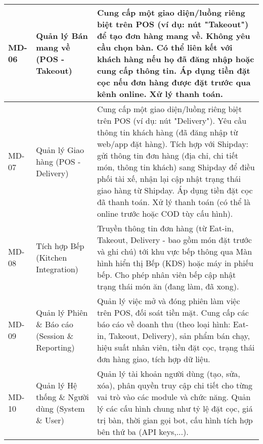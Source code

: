 \begin{longtable}{|m{1.5cm}|m{4.5cm}|m{9cm}|}
	\hline
	MD-06       & Quản lý Bán mang về (POS - Takeout)                     & Cung cấp một giao diện/luồng riêng biệt trên POS (ví dụ: nút "Takeout") để tạo đơn hàng mang về. Không yêu cầu chọn bàn. Có thể liên kết với khách hàng nếu họ đã đăng nhập hoặc cung cấp thông tin. Áp dụng tiền đặt cọc nếu đơn hàng được đặt trước qua kênh online. Xử lý thanh toán.                                                                                                                                   \\
	\hline
	MD-07       & Quản lý Giao hàng (POS - Delivery)                      & Cung cấp một giao diện/luồng riêng biệt trên POS (ví dụ: nút "Delivery"). Yêu cầu thông tin khách hàng (đã đăng nhập từ web/app đặt hàng). Tích hợp với Shipday: gửi thông tin đơn hàng (địa chỉ, chi tiết món, thông tin khách) sang Shipday để điều phối tài xế, nhận lại cập nhật trạng thái giao hàng từ Shipday. Áp dụng tiền đặt cọc đã thanh toán. Xử lý thanh toán (có thể là online trước hoặc COD tùy cấu hình). \\
	\hline
	MD-08       & Tích hợp Bếp (Kitchen Integration)                      & Truyền thông tin đơn hàng (từ Eat-in, Takeout, Delivery - bao gồm món đặt trước và ghi chú) tới khu vực bếp thông qua Màn hình hiển thị Bếp (KDS) hoặc máy in phiếu bếp. Cho phép nhân viên bếp cập nhật trạng thái món ăn (đang làm, đã xong).                                                                                                                                                                            \\
	\hline
	MD-09       & Quản lý Phiên \& Báo cáo (Session \& Reporting)         & Quản lý việc mở và đóng phiên làm việc trên POS, đối soát tiền mặt. Cung cấp các báo cáo về doanh thu (theo loại hình: Eat-in, Takeout, Delivery), sản phẩm bán chạy, hiệu suất nhân viên, tiền đặt cọc, trạng thái đơn hàng giao, tích hợp dữ liệu.                                                                                                                                                                       \\
	\hline
	MD-10       & Quản lý Hệ thống \& Người dùng (System \& User)         & Quản lý tài khoản người dùng (tạo, sửa, xóa), phân quyền truy cập chi tiết cho từng vai trò vào các module và chức năng. Quản lý các cấu hình chung như tỷ lệ đặt cọc, giá trị bàn, thời gian gọi bot, cấu hình tích hợp bên thứ ba (API keys,...).                                                                                                                                                                        \\
	\hline
\end{longtable}

